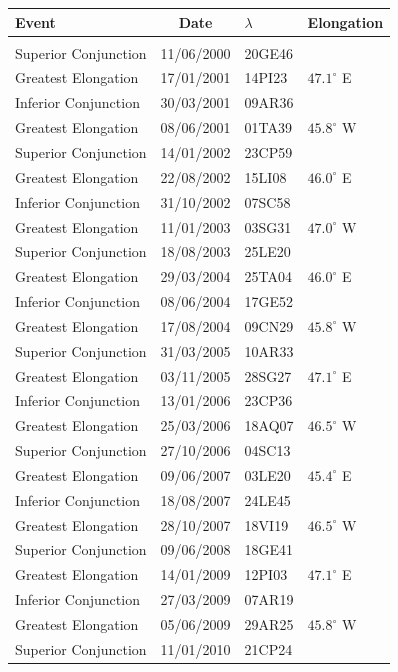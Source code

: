 \clearpage
\begin{table}[!h]\centering
\vspace{0.25cm}
{\small\begin{tabular}{lcll}
Event & Date & $\lambda$& Elongation \\\hline
&&&\\[-1.75ex]
Superior Conjunction & 11/06/2000 & 20GE46&\\
Greatest Elongation & 17/01/2001 & 14PI23 & $47.1^\circ$ E\\
Inferior Conjunction & 30/03/2001 & 09AR36&\\
Greatest Elongation & 08/06/2001 & 01TA39 & $45.8^\circ$ W\\
Superior Conjunction & 14/01/2002 & 23CP59&\\
Greatest Elongation & 22/08/2002 & 15LI08 & $46.0^\circ$ E\\
Inferior Conjunction & 31/10/2002 & 07SC58&\\
Greatest Elongation & 11/01/2003 & 03SG31 & $47.0^\circ$ W\\
Superior Conjunction & 18/08/2003 & 25LE20&\\
Greatest Elongation & 29/03/2004 & 25TA04 & $46.0^\circ$ E\\
Inferior Conjunction & 08/06/2004 & 17GE52&\\
Greatest Elongation & 17/08/2004 & 09CN29 & $45.8^\circ$ W\\
Superior Conjunction & 31/03/2005 & 10AR33&\\
Greatest Elongation & 03/11/2005 & 28SG27 & $47.1^\circ$ E\\
Inferior Conjunction & 13/01/2006 & 23CP36&\\
Greatest Elongation & 25/03/2006 & 18AQ07 & $46.5^\circ$ W\\
Superior Conjunction & 27/10/2006 & 04SC13&\\
Greatest Elongation & 09/06/2007 & 03LE20 & $45.4^\circ$ E\\
Inferior Conjunction & 18/08/2007 & 24LE45&\\
Greatest Elongation & 28/10/2007 & 18VI19 & $46.5^\circ$ W\\
Superior Conjunction & 09/06/2008 & 18GE41&\\
Greatest Elongation & 14/01/2009 & 12PI03 & $47.1^\circ$ E\\
Inferior Conjunction & 27/03/2009 & 07AR19&\\
Greatest Elongation & 05/06/2009 & 29AR25 & $45.8^\circ$ W\\
Superior Conjunction & 11/01/2010 & 21CP24&\\

\end{tabular}}
\end{table}

